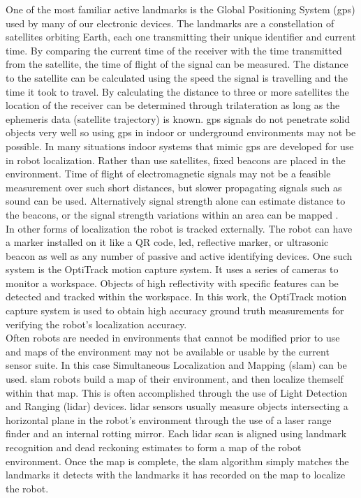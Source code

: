 One of the most familiar active landmarks is the Global Positioning System (\acrshort{gps}) used by many of our electronic devices. The landmarks are a constellation of satellites orbiting Earth, each one transmitting their unique identifier and current time. By comparing the current time of the receiver with the time transmitted from the satellite, the time of flight of the signal can be measured. The distance to the satellite can be calculated using the speed the signal is travelling and the time it took to travel. By calculating the distance to three or more satellites the location of the receiver can be determined through trilateration as long as the ephemeris data (satellite trajectory) is known. \acrshort{gps} signals do not penetrate solid objects very well so using \acrshort{gps} in indoor or underground environments may not be possible. In many situations indoor systems that mimic \acrshort{gps} are developed for use in robot localization. Rather than use satellites, fixed beacons are placed in the environment. Time of flight of electromagnetic signals may not be a feasible measurement over such short distances, but slower propagating signals such as sound can be used. Alternatively signal strength alone can estimate distance to the beacons, or the signal strength variations within an area can be mapped \cite{signal}.\\

In other forms of localization the robot is tracked externally. The robot can have a marker installed on it like a QR code, \acrshort{led}, reflective marker, or ultrasonic beacon as well as any number of passive and active identifying devices. One such system is the OptiTrack motion capture system. It uses a series of cameras to monitor a workspace. Objects of high reflectivity with specific features can be detected and tracked within the workspace. In this work, the OptiTrack motion capture system is used to obtain high accuracy ground truth measurements for verifying the robot's localization accuracy.\\

Often robots are needed in environments that cannot be modified prior to use and maps of the environment may not be available or usable by the current sensor suite. In this case Simultaneous Localization and Mapping (\acrshort{slam}) can be used. \acrshort{slam} robots build a map of their environment, and then localize themself within that map. This is often accomplished through the use of Light Detection and Ranging (\acrshort{lidar}) devices. \acrshort{lidar} sensors usually measure objects intersecting a horizontal plane in the robot's environment through the use of a laser range finder and an internal rotting mirror. Each \acrshort{lidar} scan is aligned using landmark recognition and dead reckoning estimates to form a map of the robot environment. Once the map is complete, the \acrshort{slam} algorithm simply matches the landmarks it detects with the landmarks it has recorded on the map to localize the robot.\\

